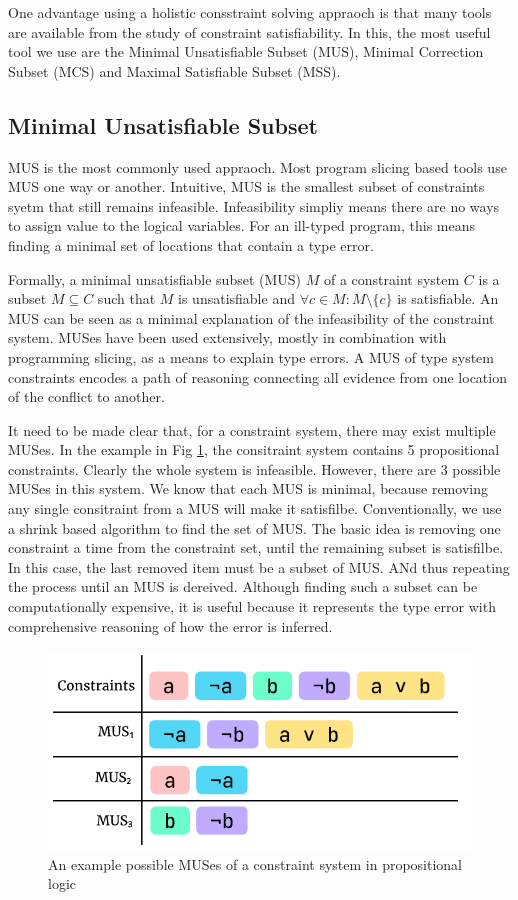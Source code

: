 One advantage using a holistic consstraint solving appraoch is that many tools are available from the study of constraint satisfiability. In this, the most useful tool we use are the Minimal Unsatisfiable Subset (MUS), Minimal Correction Subset (MCS) and Maximal Satisfiable Subset (MSS).  

\subsection{Minimal Unsatisfiable Subset}

MUS is the most commonly used appraoch. Most program slicing based tools \cite{Haack2004-fr, Pavlinovic2015-ke, Stuckey2003-pz} use MUS one way or another. Intuitive, MUS is the smallest subset of constraints syetm that still remains infeasible. Infeasibility simpliy means there are no ways to assign value to the logical variables. For an ill-typed program, this means finding a minimal set of locations that contain a type error. 

Formally,  a minimal unsatisfiable subset (MUS) $M$ of a constraint system $C$ is a subset $M \subseteq C$ such that $M$ is unsatisfiable and $ \forall{c} \in M : M \setminus \{c\}$ is satisfiable. An MUS can be seen as a minimal explanation of the infeasibility of the constraint system. MUSes have been used extensively, mostly in combination with programming slicing, as a means to explain type errors. A MUS of type system constraints encodes a path of reasoning connecting all evidence from one location of the conflict to another.


It need to be made clear that, for a constraint system, there may exist multiple MUSes. In the example in Fig \ref{fig:mus-example}, the consitraint system contains 5 propositional constraints. Clearly the whole system is infeasible. However, there are 3 possible MUSes in this system. We know that each MUS is minimal, because removing any single consitraint from a MUS will make it satisfilbe. Conventionally, we use a shrink based algorithm to find the set of MUS. The basic idea is removing one constraint a time from the constraint set, until the remaining subset is satisfilbe. In this case, the last removed item must be a subset of MUS. ANd thus repeating the process until an MUS is dereived. Although finding such a subset can be computationally expensive, it is useful because it represents the type error with comprehensive reasoning of how the error is inferred.


\begin{figure}[hbt]
  \includegraphics[width=0.8\linewidth]{MUS}
  \caption{
    \label{fig:mus-example}
      An example possible MUSes of a constraint system in propositional logic}
\end{figure}

